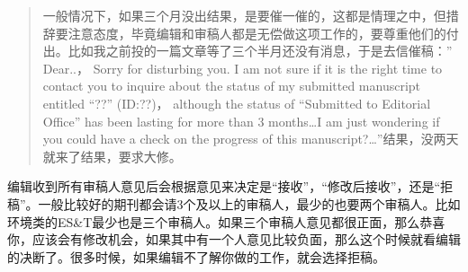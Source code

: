 \documentclass[]{book}
\begin{document}
\begin{quote}
一般情况下，如果三个月没出结果，是要催一催的，这都是情理之中，但措辞要注意态度，毕竟编辑和审稿人都是无偿做这项工作的，要尊重他们的付出。比如我之前投的一篇文章等了三个半月还没有消息，于是去信催稿：''
Dear..， Sorry for disturbing you. I am not sure if it is the right time
to contact you to inquire about the status of my submitted manuscript
entitled ``??'' (ID:??)， although the status of ``Submitted to
Editorial Office'' has been lasting for more than 3 months\ldots{}I am
just wondering if you could have a check on the progress of this
manuscript?\ldots{}''结果，没两天就来了结果，要求大修。
\end{quote}

编辑收到所有审稿人意见后会根据意见来决定是``接收''，``修改后接收''，还是``拒稿''。一般比较好的期刊都会请3个及以上的审稿人，最少的也要两个审稿人。比如环境类的ES\&T最少也是三个审稿人。如果三个审稿人意见都很正面，那么恭喜你，应该会有修改机会，如果其中有一个人意见比较负面，那么这个时候就看编辑的决断了。很多时候，如果编辑不了解你做的工作，就会选择拒稿。
\end{document}
